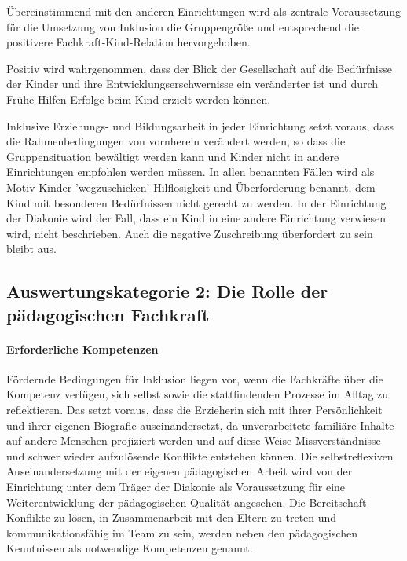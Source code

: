 Übereinstimmend mit den anderen Einrichtungen wird als zentrale Voraussetzung für die Umsetzung von Inklusion die Gruppengröße und entsprechend die positivere Fachkraft-Kind-Relation hervorgehoben. 

Positiv wird wahrgenommen, dass der Blick der Gesellschaft auf die Bedürfnisse der Kinder und ihre Entwicklungserschwernisse ein veränderter ist und durch Frühe Hilfen Erfolge beim Kind erzielt werden können. 

Inklusive Erziehungs- und Bildungsarbeit in jeder Einrichtung setzt voraus, dass die Rahmenbedingungen von vornherein verändert werden, so dass die Gruppensituation bewältigt werden kann und Kinder nicht in andere Einrichtungen empfohlen werden müssen. In allen  benannten Fällen wird als Motiv Kinder 'wegzuschicken' Hilflosigkeit und Überforderung benannt, dem Kind mit besonderen Bedürfnissen nicht gerecht zu werden. In der Einrichtung der Diakonie wird der Fall, dass ein Kind in eine andere Einrichtung verwiesen wird, nicht beschrieben. Auch die negative Zuschreibung überfordert zu sein bleibt aus. %

\subsection{Auswertungskategorie 2: Die Rolle der pädagogischen Fachkraft}

\paragraph{Erforderliche Kompetenzen}
Fördernde Bedingungen für Inklusion liegen vor, wenn die Fachkräfte über die Kompetenz verfügen, sich selbst sowie die stattfindenden Prozesse im Alltag zu reflektieren. Das setzt voraus, dass die Erzieherin sich mit ihrer Persönlichkeit und ihrer eigenen Biografie auseinandersetzt, da unverarbeitete familiäre Inhalte auf andere Menschen projiziert werden und auf diese Weise Missverständnisse und schwer wieder aufzulösende Konflikte entstehen können. Die selbstreflexiven Auseinandersetzung mit der eigenen pädagogischen Arbeit wird von der Einrichtung unter dem Träger der Diakonie als Voraussetzung für eine Weiterentwicklung der pädagogischen Qualität angesehen. 
Die Bereitschaft Konflikte zu lösen, in Zusammenarbeit mit den Eltern zu treten und kommunikationsfähig im Team zu sein, werden neben den pädagogischen Kenntnissen als notwendige Kompetenzen genannt.

